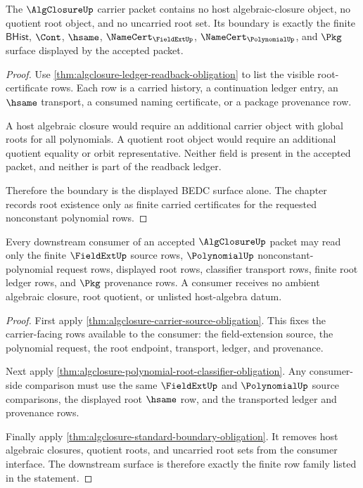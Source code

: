 \begin{theorem}
\label{thm:algclosure-standard-boundary-obligation}
The $\AlgClosureUp$ carrier packet contains no host algebraic-closure object,
no quotient root object, and no uncarried root set. Its boundary is exactly the
finite $\mathsf{BHist}$, $\Cont$, $\hsame$, $\NameCert_{\FieldExtUp}$,
$\NameCert_{\PolynomialUp}$, and $\Pkg$ surface displayed by the accepted
packet.
\end{theorem}
\begin{proof}
Use \autoref{thm:algclosure-ledger-readback-obligation} to list the visible
root-certificate rows. Each row is a carried history, a continuation ledger
entry, an $\hsame$ transport, a consumed naming certificate, or a package
provenance row.

A host algebraic closure would require an additional carrier object with
global roots for all polynomials. A quotient root object would require an
additional quotient equality or orbit representative. Neither field is present
in the accepted packet, and neither is part of the readback ledger.

Therefore the boundary is the displayed BEDC surface alone. The chapter records
root existence only as finite carried certificates for the requested
nonconstant polynomial rows.
\end{proof}

\begin{theorem}
\label{thm:algclosure-downstream-consumer-obligation}
Every downstream consumer of an accepted $\AlgClosureUp$ packet may read only
the finite $\FieldExtUp$ source rows, $\PolynomialUp$ nonconstant-polynomial
request rows, displayed root rows, classifier transport rows, finite root
ledger rows, and $\Pkg$ provenance rows. A consumer receives no ambient
algebraic closure, root quotient, or unlisted host-algebra datum.
\end{theorem}
\begin{proof}
First apply \autoref{thm:algclosure-carrier-source-obligation}. This fixes the
carrier-facing rows available to the consumer: the field-extension source, the
polynomial request, the root endpoint, transport, ledger, and provenance.

Next apply \autoref{thm:algclosure-polynomial-root-classifier-obligation}. Any
consumer-side comparison must use the same $\FieldExtUp$ and $\PolynomialUp$
source comparisons, the displayed root $\hsame$ row, and the transported ledger
and provenance rows.

Finally apply \autoref{thm:algclosure-standard-boundary-obligation}. It removes
host algebraic closures, quotient roots, and uncarried root sets from the
consumer interface. The downstream surface is therefore exactly the finite
row family listed in the statement.
\end{proof}

